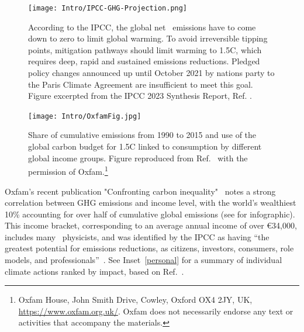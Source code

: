 \documentclass[../SustainableHEP.tex]{subfiles}
\begin{document}

\begin{figure}
    \centering
    \texttt{[image: Intro/IPCC-GHG-Projection.png]}
    \caption[Necessary reduction in global emissions]%
        {According to the IPCC, the global net \CdO\ emissions have to come down to zero to limit global warming. To avoid irreversible tipping points, mitigation pathways should limit warming to 1.5\degree C, which requires deep, rapid and sustained emissions reductions.  Pledged policy changes announced up until October 2021 by nations party to the Paris Climate Agreement are insufficient to meet this goal.  Figure excerpted from the IPCC 2023 Synthesis Report, Ref. \cite{IPCC2023SynthesisSPM}.
        \label{fig:ene-netco2}}
    \end{figure}


\begin{figure}
    \centering
    \texttt{[image: Intro/OxfamFig.jpg]}
    \caption[Global emissions (1990--2015) by income groups]{Share of cumulative emissions from 1990 to 2015 and use of the global carbon budget for 1.5\degree C linked to consumption by different global income groups. Figure reproduced from Ref.~\cite{Oxfam2020} with the permission of Oxfam.\footnote{Oxfam House, John Smith Drive, Cowley, Oxford OX4 2JY, UK, \url{https://www.oxfam.org.uk/}.  Oxfam does not necessarily endorse any text or activities that accompany the materials.}}
    \label{fig:OxfamFig}
\end{figure}

Oxfam's recent publication "Confronting carbon inequality"~\cite{Oxfam2020} notes a strong correlation between GHG emissions and income level, with the world's wealthiest 10\% accounting for over half of cumulative global emissions (see  for infographic). This income bracket, corresponding to an average annual income of over \euro{34,000}, includes many \ACR\ physicists, and was identified by the IPCC as having ``the greatest potential for emissions reductions, \eg as citizens, investors, consumers, role models, and professionals''~\cite{IPCC2022reportSPM}.  See Inset~\ref{personal} for a summary of individual climate actions ranked by impact, based on Ref.~\cite{Wynes_2017}. 
\end{document}
